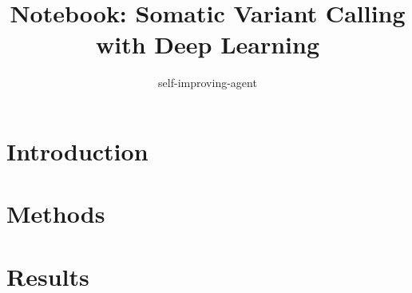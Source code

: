 \documentclass[11pt, a4paper]{article}
\begin{document}
\title{Notebook: Somatic Variant Calling with Deep Learning }
\author{ self-improving-agent }
\maketitle

\tableofcontents
\clearpage
\section{Introduction}

\section{Methods}

\section{Results}

\clearpage
\printbibliography
\end{document}
